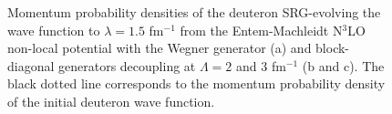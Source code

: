 \documentclass[preprintnumbers,floatfix,aps,prc,preprint,nofootinbib]{revtex4-1}
\begin{document}
\begin{figure}[H]
	\centering
	\quad
	\quad
	\caption{Momentum probability densities of the deuteron SRG-evolving the wave function to $\lambda=1.5$ fm$^{-1}$ from the Entem-Machleidt N$^3$LO non-local potential with the Wegner generator (a) and block-diagonal generators decoupling at $\Lambda=2$ and $3$ fm$^{-1}$ (b and c). The black dotted line corresponds to the momentum probability density of the initial deuteron wave function.}
	\label{deuteron_momentum_distribution_kvnn10}
\end{figure}
\end{document}
